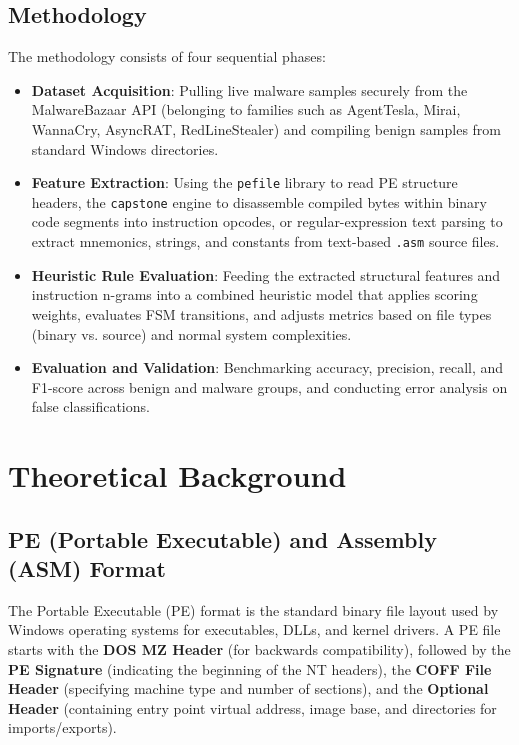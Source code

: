 \documentclass[11pt,a4paper]{article}
\begin{document}
\subsection{Methodology}
The methodology consists of four sequential phases:
\begin{itemize}
    \item \textbf{Dataset Acquisition}: Pulling live malware samples securely from the MalwareBazaar API (belonging to families such as AgentTesla, Mirai, WannaCry, AsyncRAT, RedLineStealer) and compiling benign samples from standard Windows directories.
    \item \textbf{Feature Extraction}: Using the \texttt{pefile} library to read PE structure headers, the \texttt{capstone} engine to disassemble compiled bytes within binary code segments into instruction opcodes, or regular-expression text parsing to extract mnemonics, strings, and constants from text-based \texttt{.asm} source files.
    \item \textbf{Heuristic Rule Evaluation}: Feeding the extracted structural features and instruction n-grams into a combined heuristic model that applies scoring weights, evaluates FSM transitions, and adjusts metrics based on file types (binary vs. source) and normal system complexities.
    \item \textbf{Evaluation and Validation}: Benchmarking accuracy, precision, recall, and F1-score across benign and malware groups, and conducting error analysis on false classifications.
\end{itemize}

\newpage

\section{Theoretical Background}

\subsection{PE (Portable Executable) and Assembly (ASM) Format}
The Portable Executable (PE) format is the standard binary file layout used by Windows operating systems for executables, DLLs, and kernel drivers. A PE file starts with the \textbf{DOS MZ Header} (for backwards compatibility), followed by the \textbf{PE Signature} (indicating the beginning of the NT headers), the \textbf{COFF File Header} (specifying machine type and number of sections), and the \textbf{Optional Header} (containing entry point virtual address, image base, and directories for imports/exports). 
\end{document}
